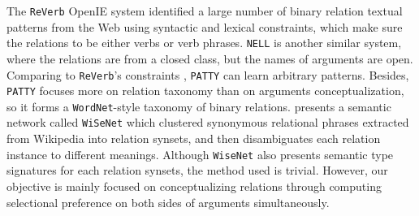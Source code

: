 



The {\tt ReVerb} OpenIE system \cite{fader2011identifying} identified a large number of
binary relation textual patterns from the Web using syntactic and lexical constraints, which make sure the relations to be either verbs or verb phrases.
{\tt NELL} \cite{carlson2010toward} is another similar system, where the relations are from a closed class, but the names of arguments are open. Comparing to {\tt ReVerb}'s constraints \cite{fader2011identifying}, {\tt PATTY} \cite{nakashole2012patty} can learn arbitrary patterns. Besides, {\tt PATTY} focuses more on relation taxonomy than on arguments conceptualization, so it forms a {\tt WordNet}-style taxonomy of binary relations. %
 presents a semantic network called {\tt WiSeNet} which clustered synonymous relational phrases extracted from Wikipedia into relation synsets, %
and then disambiguates each relation instance to different meanings. Although {\tt WiseNet} also presents semantic type signatures for each relation synsets, the method used is trivial. %
However, our objective is mainly focused on conceptualizing relations through computing selectional preference on both sides of arguments simultaneously.
%
%

